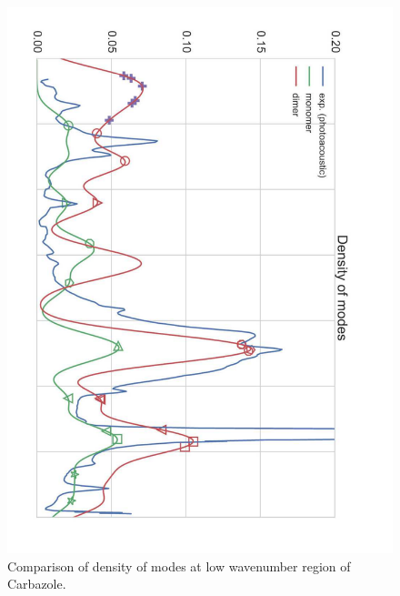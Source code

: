	\begin{figure}[H]
		\begin{center}
			\includegraphics[angle=90,scale=0.5]{image/9}
		\end{center}
		\caption{Comparison of density of modes at low wavenumber region of Carbazole.}  \label{figP2-9}
	\end{figure}
	
